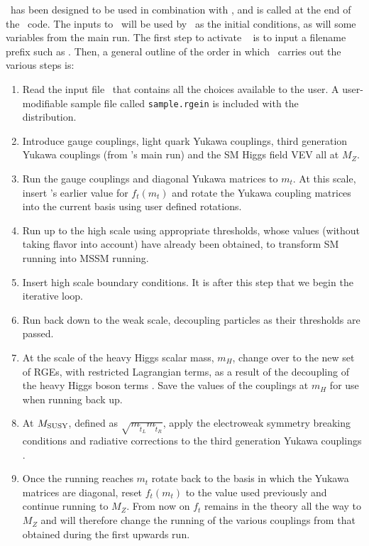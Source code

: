 \progrge~has been designed to be used in combination with \progisasug,
and is called at the end of the \progisasug~code.  The inputs to
\progisasug~will be used by \progrge~as the initial conditions, as will
some variables from the main run.  The first step to activate \progrge~
is to input a filename prefix such as \prefix.  Then, a general outline
of the order in which \progrge~carries out the various steps is:
\begin{enumerate}
\item Read the input file \inrge~that contains all the choices available to the user. A user-modifiable sample file called \texttt{sample.rgein} is included with the
\progisa~ distribution.
\item Introduce gauge couplings, light quark Yukawa couplings, third generation Yukawa couplings (from \progisasug's main run) and the SM Higgs field VEV all at $M_{Z}$.
\item Run the gauge couplings and diagonal Yukawa matrices to $m_{t}$. At this scale, insert \progisasug's earlier value for $f_{t}(m_{t})$ and rotate the Yukawa coupling matrices into the current basis using user defined rotations.
\item Run up to the high scale using appropriate thresholds, whose values (without taking flavor into account) have already been obtained, to transform SM running into MSSM running.
\item Insert high scale boundary conditions. It is after this step that we begin the iterative loop.
\item Run back down to the weak scale, decoupling particles as their thresholds are passed.
\item At the scale of the heavy Higgs scalar mass, $m_{H}$, change over to the new set of RGEs, with restricted Lagrangian terms, as a result of the decoupling of the heavy Higgs boson terms \cite{RGE2}. Save the values of the couplings at $m_{H}$ for use when running back up.
\item At $M_{\mathrm{SUSY}}$, defined as $\sqrt{m_{\tilde{t}_{L}}m_{\tilde{t}_{R}}}$, apply the electroweak symmetry breaking conditions and radiative corrections to the third generation Yukawa couplings \cite{pierce}.
\item Once the running reaches $m_{t}$ rotate back to the basis in which the Yukawa matrices are diagonal, reset $f_{t}(m_{t})$ to the value used previously and continue running to $M_{Z}$. From now on $f_{t}$ remains in the theory all the way to $M_{Z}$ and will therefore change the running of the various couplings from that obtained during the first upwards run.

\end{enumerate}

